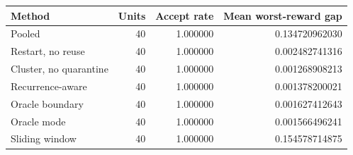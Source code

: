 \begin{tabular}{lrrr}
\toprule
Method & Units & Accept rate & Mean worst-reward gap \\
\midrule
Pooled & 40 & 1.000000 & 0.134720962030 \\
Restart, no reuse & 40 & 1.000000 & 0.002482741316 \\
Cluster, no quarantine & 40 & 1.000000 & 0.001268908213 \\
Recurrence-aware & 40 & 1.000000 & 0.001378200021 \\
Oracle boundary & 40 & 1.000000 & 0.001627412643 \\
Oracle mode & 40 & 1.000000 & 0.001566496241 \\
Sliding window & 40 & 1.000000 & 0.154578714875 \\
\bottomrule
\end{tabular}
